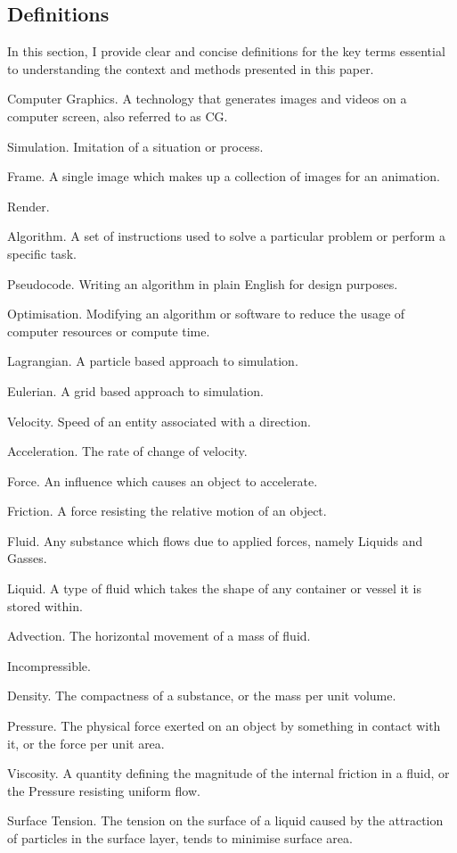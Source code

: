 \documentclass[write-up.tex]{subfiles}
\begin{document}
\subsection{Definitions}
In this section, I provide clear and concise definitions for the key terms essential to understanding the context and methods presented in this paper.
\begin{worddefs}
 \item [Computer Graphics.] A technology that generates images and videos on a computer screen, also referred to as CG.
 \item [Simulation.] Imitation of a situation or process.
 \item [Frame.] A single image which makes up a collection of images for an animation.
 \item[Render.]
 \item [Algorithm.] A set of instructions used to solve a particular problem or perform a specific task.
 \item [Pseudocode.] Writing an algorithm in plain English for design purposes.
 \item [Optimisation.] Modifying an algorithm or software to reduce the usage of computer resources or compute time.
 \item [Lagrangian.] A particle based approach to simulation.
 \item[Eulerian.] A grid based approach to simulation.
 \item[Velocity.] Speed of an entity associated with a direction.
 \item[Acceleration.] The rate of change of velocity.
 \item[Force.] An influence which causes an object to accelerate.
 \item[Friction.] A force resisting the relative motion of an object.
 \item [Fluid.] Any substance which flows due to applied forces, namely Liquids and Gasses.
 \item [Liquid.] A type of fluid which takes the shape of any container or vessel it is stored within.
 \item[Advection.] The horizontal movement of a mass of fluid.
 \item[Incompressible.]
 \item[Density.] The compactness of a substance, or the mass per unit volume.
 \item[Pressure.] The physical force exerted on an object by something in contact with it, or the force per unit area.
 \item[Viscosity.] A quantity defining the magnitude of the internal friction in a fluid, or the Pressure resisting uniform flow.
 \item[Surface Tension.] The tension on the surface of a liquid caused by the attraction of particles in the surface layer, tends to minimise surface area.
\end{worddefs}
\end{document}
